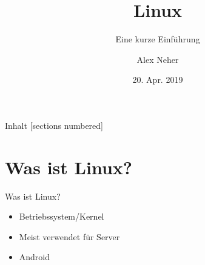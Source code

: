 \documentclass[10pt]{beamer}
\title{Linux}
\subtitle{Eine kurze Einführung}
\date{20. Apr. 2019}
\author{Alex Neher}
\begin{document}
\pagestyle{empty}
	
\begin{frame}

\end{frame}

\maketitle

\begin{frame}{Inhalt}
  [sections numbered]
  \tableofcontents[hideallsubsections]
\end{frame}

\section{Was ist Linux?}

\begin{frame}{Was ist Linux?}
    \begin{itemize}[<+- | alert@+>]
        \item Betriebssystem/Kernel
        \item Meist verwendet für Server
        \item Android
    \end{itemize}

\end{frame}
\end{document}
